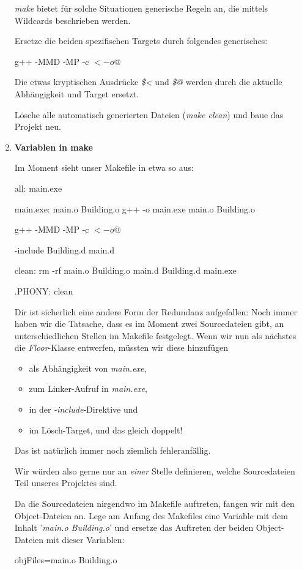 \begin{enumerate}
\emph{make} bietet für solche Situationen generische Regeln an, die mittels Wildcards beschrieben werden.

Ersetze die beiden spezifischen Targets durch folgendes generisches:
\begin{lstmake}
	g++ -MMD -MP -c $< -o $@
\end{lstmake}
Die etwas kryptischen Ausdrücke \emph{\$<} und \emph{\$@} werden durch die aktuelle Abhängigkeit und Target ersetzt.

Lösche alle automatisch generierten Dateien (\emph{make clean}) und baue das Projekt neu.





\item\textbf{Variablen in make}

Im Moment sieht unser Makefile in etwa so aus:
\begin{lstmake}
all: main.exe

main.exe: main.o Building.o
	g++ -o main.exe main.o Building.o

	g++ -MMD -MP -c $< -o $@

-include Building.d main.d

clean:
	rm -rf main.o Building.o main.d Building.d main.exe
	
.PHONY: clean
\end{lstmake}

Dir ist sicherlich eine andere Form der Redundanz aufgefallen:
Noch immer haben wir die Tatsache, dass es im Moment zwei Sourcedateien gibt, an unterschiedlichen Stellen im Makefile festgelegt.
Wenn wir nun als nächstes die \emph{Floor}-Klasse entwerfen, müssten wir diese hinzufügen
\begin{itemize}
	\item als Abhängigkeit von \emph{main.exe},
	\item zum Linker-Aufruf in \emph{main.exe},
	\item in der \emph{-include}-Direktive und
	\item im Lösch-Target, und das gleich doppelt!
\end{itemize}
Das ist natürlich immer noch ziemlich fehleranfällig.

Wir würden also gerne nur an \emph{einer} Stelle definieren, welche Sourcedateien Teil unseres Projektes sind.

Da die Sourcedateien nirgendwo im Makefile auftreten, fangen wir mit den Object-Dateien an.
Lege am Anfang des Makefiles eine Variable mit dem Inhalt '\emph{main.o Building.o}' und ersetze das Auftreten der beiden Object-Dateien mit dieser Variablen:
\begin{lstmake}
objFiles=main.o Building.o


\end{lstmake}
\end{enumerate}
